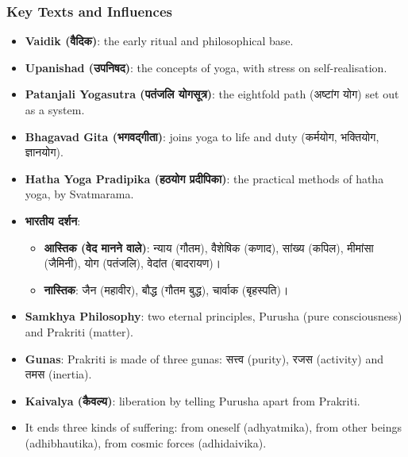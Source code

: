 \begin{frame}[fragile,shrink=6]\frametitle{Key Texts and Influences}

  \begin{itemize}
	\item \textbf{Vaidik (वैदिक)}: the early ritual and philosophical base.
	\item \textbf{Upanishad (उपनिषद)}: the concepts of yoga, with stress on self-realisation.
	\item \textbf{Patanjali Yogasutra (पतंजलि योगसूत्र)}: the eightfold path (अष्टांग योग) set out as a system.
	\item \textbf{Bhagavad Gita (भगवद्गीता)}: joins yoga to life and duty (कर्मयोग, भक्तियोग, ज्ञानयोग).
	\item \textbf{Hatha Yoga Pradipika (हठयोग प्रदीपिका)}: the practical methods of hatha yoga, by Svatmarama.
	\item \textbf{भारतीय दर्शन}:
		\begin{itemize}
			\item \textbf{आस्तिक (वेद मानने वाले)}: न्याय (गौतम), वैशेषिक (कणाद), सांख्य (कपिल), मीमांसा (जैमिनी), योग (पतंजलि), वेदांत (बादरायण)।
			\item \textbf{नास्तिक}: जैन (महावीर), बौद्ध (गौतम बुद्ध), चार्वाक (बृहस्पति)।
	    \end{itemize}
	\item \textbf{Samkhya Philosophy}: two eternal principles, Purusha (pure consciousness) and Prakriti (matter).
	\item \textbf{Gunas}: Prakriti is made of three gunas: सत्त्व (purity), रजस (activity) and तमस (inertia).
	\item \textbf{Kaivalya (कैवल्य)}: liberation by telling Purusha apart from Prakriti.
	\item It ends three kinds of suffering: from oneself (adhyatmika), from other beings (adhibhautika), from cosmic forces (adhidaivika).
  \end{itemize}

\end{frame}

